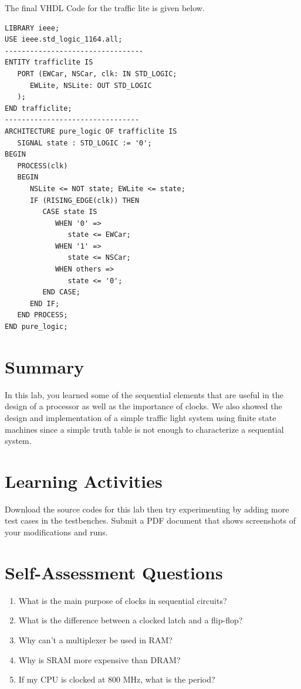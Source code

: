 \documentclass[a4paper, 11pt,oneside]{article}
\begin{document}
The final VHDL Code for the traffic lite is given below.

\begin{verbatim}
LIBRARY ieee;
USE ieee.std_logic_1164.all;
---------------------------------
ENTITY trafficlite IS
   PORT (EWCar, NSCar, clk: IN STD_LOGIC;
      EWLite, NSLite: OUT STD_LOGIC
   );
END trafficlite;
--------------------------------
ARCHITECTURE pure_logic OF trafficlite IS
   SIGNAL state : STD_LOGIC := '0'; 
BEGIN
   PROCESS(clk)
   BEGIN
      NSLite <= NOT state; EWLite <= state;
      IF (RISING_EDGE(clk)) THEN
         CASE state IS
            WHEN '0' =>
               state <= EWCar;
            WHEN '1' =>
               state <= NSCar;
            WHEN others => 
               state <= '0';
         END CASE;
      END IF; 
   END PROCESS;
END pure_logic;
\end{verbatim}


\section{Summary}
In this lab, you learned some of the sequential elements that are useful in the 
design of a processor as well as the importance of clocks. We also showed the
design and implementation of a simple traffic light system using finite state 
machines since a simple truth table is not enough to characterize a sequential 
system. 

\section{Learning Activities}
Download the source codes for this lab then try experimenting by adding more 
test cases in the testbenches. Submit a PDF document that shows screenshots of 
your modifications and runs. 

\section{Self-Assessment Questions}
\begin{enumerate}
\item What is the main purpose of clocks in sequential circuits?
\item What is the difference between a clocked latch and a flip-flop?
\item Why can't a multiplexer be used in RAM?
\item Why is SRAM more expensive than DRAM?
\item If my CPU is clocked at 800 MHz, what is the period?
\end{enumerate}
\end{document}
